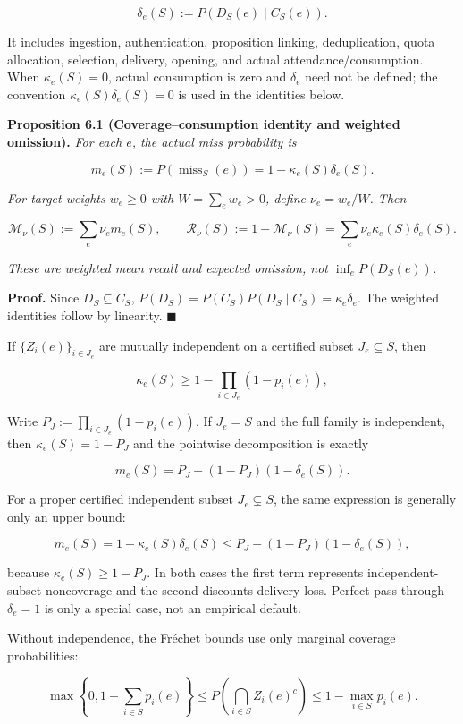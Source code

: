 \documentclass[
  11pt]{article}
\begin{document}
\[\delta_e(S):=P(D_S(e)\mid C_S(e)).\]

It includes ingestion, authentication, proposition linking,
deduplication, quota allocation, selection, delivery, opening, and
actual attendance/consumption. When \(\kappa_e(S)=0\), actual
consumption is zero and \(\delta_e\) need not be defined; the convention
\(\kappa_e(S)\delta_e(S)=0\) is used in the identities below.

\textbf{Proposition 6.1 (Coverage--consumption identity and weighted
omission).} \emph{For each \(e\), the actual miss probability is}

\[m_e(S):=P(\operatorname{miss}_S(e))=1-\kappa_e(S)\delta_e(S).\tag{7}\]

\emph{For target weights \(w_e\ge0\) with \(W=\sum_ew_e>0\), define
\(\nu_e=w_e/W\). Then}

\[\mathcal M_\nu(S):=\sum_e\nu_em_e(S),\qquad \mathcal R_\nu(S):=1-\mathcal M_\nu(S)=\sum_e\nu_e\kappa_e(S)\delta_e(S).\tag{8}\]

\emph{These are weighted mean recall and expected omission, not
\(\inf_e P(D_S(e))\).}

\textbf{Proof.} Since \(D_S\subseteq C_S\),
\(P(D_S)=P(C_S)P(D_S\mid C_S)=\kappa_e\delta_e\). The weighted
identities follow by linearity. \(\blacksquare\)

If \(\{Z_i(e)\}_{i\in J_e}\) are mutually independent on a certified
subset \(J_e\subseteq S\), then

\[\kappa_e(S)\ge1-\prod_{i\in J_e}(1-p_i(e)),\]

Write \(P_J:=\prod_{i\in J_e}(1-p_i(e))\). If \(J_e=S\) and the full
family is independent, then \(\kappa_e(S)=1-P_J\) and the pointwise
decomposition is exactly

\[m_e(S)=P_J+(1-P_J)(1-\delta_e(S)).\]

For a proper certified independent subset \(J_e\subsetneq S\), the same
expression is generally only an upper bound:

\[m_e(S)=1-\kappa_e(S)\delta_e(S)\le P_J+(1-P_J)(1-\delta_e(S)),\]

because \(\kappa_e(S)\ge1-P_J\). In both cases the first term represents
independent-subset noncoverage and the second discounts delivery loss.
Perfect pass-through \(\delta_e=1\) is only a special case, not an
empirical default.

Without independence, the Fréchet bounds use only marginal coverage
probabilities:

\[\max\left\{0,1-\sum_{i\in S}p_i(e)\right\}\le P\!\left(\bigcap_{i\in S}Z_i(e)^c\right)\le1-\max_{i\in S}p_i(e).\]
\end{document}
